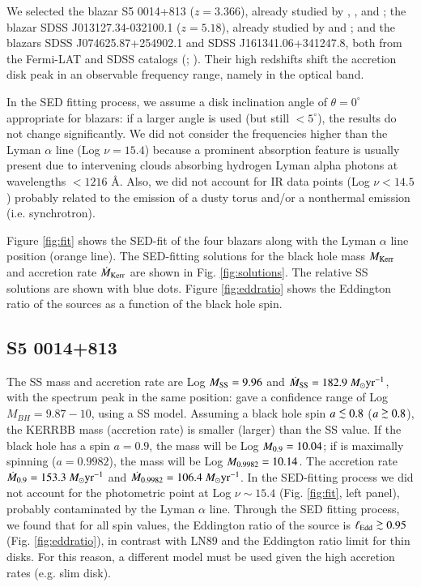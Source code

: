 \documentclass{aa}
\def\spose#1{\hbox to 0pt{#1\hss}}
\newcommand\lsim{\mathrel{\spose{\lower 3pt\hbox{$\mathchar"218$}}
     \raise 2.0pt\hbox{$\mathchar"13C$}}}
\newcommand\gsim{\mathrel{\spose{\lower 3pt\hbox{$\mathchar"218$}}
     \raise 2.0pt\hbox{$\mathchar"13E$}}}
\begin{document}
We selected the blazar S5 0014+813 ($z = 3.366$), already studied by \citet{Kuhretal1}, \citet{Kuhretal2}, \citet{Ghi2009S5} and \citet{Sbaretal}; the blazar SDSS J013127.34-032100.1 ($z=5.18$), already studied by \citet{Yietal} and \citet{Ghi2015}; and the blazars SDSS J074625.87+254902.1 and SDSS J161341.06+341247.8, both from the Fermi-LAT and SDSS catalogs (\citealt{Shenetal11}; \citealt{Shawetal}). Their high redshifts shift the accretion disk peak in an observable frequency range, namely in the optical band.

In the SED fitting process, we assume a disk inclination angle of $\theta = 0^{\circ}$ appropriate for blazars: if a larger angle is used (but still $< 5^{\circ}$), the results do not change significantly. We did not consider the frequencies higher than the Lyman $\alpha$ line (Log $\nu = 15.4$) because a prominent absorption feature is usually present due to intervening clouds absorbing hydrogen Lyman alpha photons at wavelengths $<1216$ \AA. Also, we did not account for IR data points (Log $\nu < 14.5$) probably related to the emission of a dusty torus and/or a nonthermal emission (i.e. synchrotron).

Figure \ref{fig:fit} shows the SED-fit of the four blazars along with the Lyman $\alpha$ line position (orange line). The SED-fitting solutions for the black hole mass $M_{\rm Kerr}$ and accretion rate $\dot{M}_{\rm Kerr}$ are shown in Fig. \ref{fig:solutions}. The relative SS solutions are shown with blue dots. Figure \ref{fig:eddratio} shows the Eddington ratio of the sources as a function of the black hole spin.



\subsection{S5 0014+813} 

The SS mass and accretion rate are Log $M_{\rm SS} = 9.96$ and $\dot{M}_{\rm SS} = 182.9\ M_{\odot} \text{yr}^{-1}$, with the spectrum peak in the same position: \citet{Sbaretal} gave a confidence range of Log $M_{BH} = 9.87 - 10$, using a SS model. Assuming a black hole spin $a \lsim 0.8$ ($a \gsim 0.8$), the KERRBB mass (accretion rate) is smaller (larger) than the SS value. If the black hole has a spin $a = 0.9$, the mass will be Log $M_{\rm 0.9} = 10.04$; if is maximally spinning ($a = 0.9982$), the mass will be Log $M_{\rm 0.9982} = 10.14$. The accretion rate $\dot{M}_{\rm 0.9} = 153.3\ M_{\odot} \text{yr}^{-1}$ and $\dot{M}_{\rm 0.9982} = 106.4\ M_{\odot} \text{yr}^{-1}$. In the SED-fitting process we did not account for the photometric point at Log $\nu \sim 15.4$ (Fig. \ref{fig:fit}, left panel), probably contaminated by the Lyman $\alpha$ line. Through the SED fitting process, we found that for all spin values, the Eddington ratio of the source is $\ell_{\rm Edd} \gsim 0.95$ (Fig. \ref{fig:eddratio}), in contrast with LN89 and the Eddington ratio limit for thin disks. For this reason, a different model must be used given the high accretion rates (e.g. slim disk).
\end{document}
